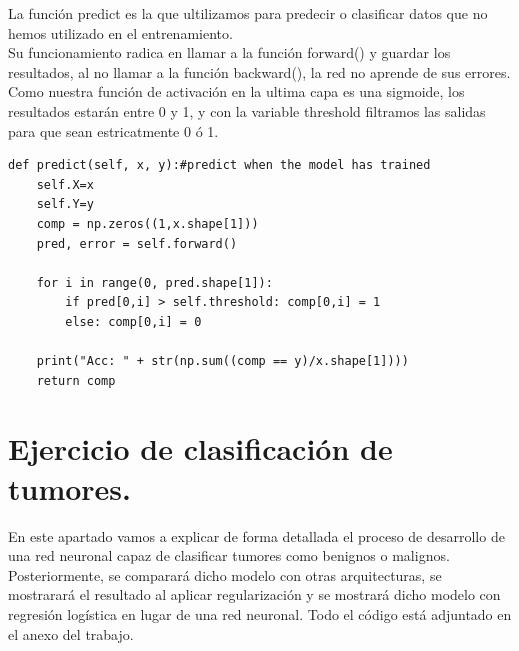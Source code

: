 \documentclass[a4paper,10pt]{article}
\begin{document}
La función predict es la que ultilizamos para predecir o clasificar datos que no hemos utilizado en el entrenamiento.\\ Su funcionamiento radica en llamar a la función forward() y guardar los resultados, al no llamar a la función backward(), la red no aprende de sus errores. \\Como nuestra función de activación en la ultima capa es una sigmoide, los resultados estarán entre 0 y 1, y con la variable threshold filtramos las salidas para que sean estricatmente 0 ó 1.  
\begin{lstlisting}
def predict(self, x, y):#predict when the model has trained
    self.X=x
    self.Y=y
    comp = np.zeros((1,x.shape[1]))
    pred, error = self.forward()    
    
    for i in range(0, pred.shape[1]):
        if pred[0,i] > self.threshold: comp[0,i] = 1
        else: comp[0,i] = 0
    
    print("Acc: " + str(np.sum((comp == y)/x.shape[1]))) 
    return comp
\end{lstlisting}
\newpage
\section{Ejercicio de clasificación de tumores.}
En este apartado vamos a explicar de forma detallada el proceso de desarrollo de una red neuronal capaz de clasificar tumores como benignos o malignos. Posteriormente, se comparará dicho modelo con otras arquitecturas, se mostrarará el resultado al aplicar regularización y se mostrará dicho modelo con regresión logística en lugar de una red neuronal. Todo el código está adjuntado en el anexo del trabajo.
\end{document}
